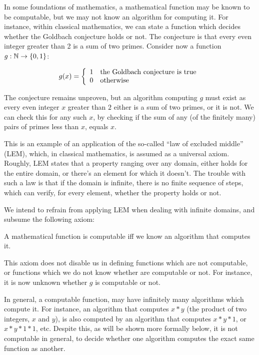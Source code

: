 In some foundations of mathematics, a mathematical function may be known to be
computable, but we may not know an algorithm for computing it. For instance,
within classical mathematics, we can state a function which decides whether the
Goldbach conjecture\cite{dickson-1919-goldbach} holds or not. The conjecture is
that every even integer greater than 2 is a sum of two primes.  Consider now a
function $g:\mathbb{N}\rightarrow\mathopen{}\left\{{0,1}\right\}\mathclose{}$:

$$g\mathopen{}\left({x}\right)\mathclose{} = \left\{
\begin{array}{l l}
1 & \text{the Goldbach conjecture is true} \\
0 & \text{otherwise}
\end{array}
\right.$$

The conjecture remains unproven, but an algorithm computing $g$ must exist as
every even integer $x$ greater than $2$ either is a sum of two primes, or it is
not. We can check this for any such $x$, by checking if the sum of any (of the
finitely many) pairs of primes less than $x$, equals $x$.

This is an example of an application of the so-called ``law of excluded
middle'' (LEM), which, in classical mathematics, is assumed as a universal
axiom. Roughly, LEM states that a property ranging over any domain, either
holds for the entire domain, or there's an element for which it doesn't. The
trouble with such a law is that if the domain is infinite, there is no finite
sequence of steps, which can verify, for every element, whether the property
holds or not.

We intend to refrain from applying LEM when dealing with infinite domains, and
subsume the following axiom:

\begin{textaxiom} A mathematical function is computable iff we know an
algorithm that computes it. \end{textaxiom}

This axiom does not disable us in defining functions which are not computable,
or functions which we do not know whether are computable or not. For instance,
it is now unknown whether $g$ is computable or not.

In general, a computable function, may have infinitely many algorithms which
compute it. For instance, an algorithm that computes $x*y$ (the product of two
integers, $x$ and $y$), is also computed by an algorithm that computes $x*y*1$,
or $x*y*1*1$, etc. Despite this, as will be shown more formally below, it is
not computable in general, to decide whether one algorithm computes the exact
same function as another.

